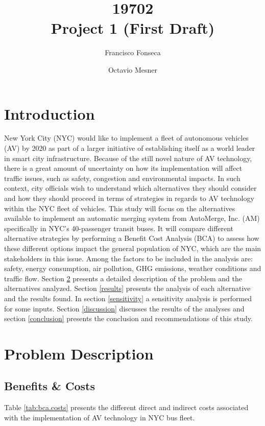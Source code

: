 \documentclass[11pt, letterpaper]{article}
\title{\vspace{-2cm} 19702 \\ Project 1 (First Draft)}
\author{Francisco Fonseca \and Octavio Mesner}
\date{\mydate}
\date{\mydateformat\normalsize\mydate} %
\begin{document}
\maketitle %

\section{Introduction} \label{intro}

New York City (NYC) would like to implement a fleet of autonomous vehicles (AV) by 2020 as part of a larger initiative of establishing itself as a world leader in smart city infrastructure. Because of the still novel nature of AV technology, there is a great amount of uncertainty on how its implementation will affect traffic issues, such as safety, congestion and environmental impacts. In such context, city officials wish to understand which alternatives they should consider and how they should proceed in terms of strategies in regards to AV technology within the NYC fleet of vehicles. This study will focus on the alternatives available to implement an automatic merging system from AutoMerge, Inc. (AM) specifically in NYC's 40-passenger transit buses. It will compare different alternative strategies by performing a Benefit Cost Analysis (BCA) to assess how these different options impact the general population of NYC, which are the main stakeholders in this issue. Among the factors to be included in the analysis are: safety, energy consumption, air pollution, GHG emissions, weather conditions and traffic flow. Section \ref{problem} presents a detailed description of the problem and the alternatives analyzed. Section \ref{results} presents the analysis of each alternative and the results found. In section \ref{sensitivity} a sensitivity analysis is performed for some inputs. Section \ref{discussion} discusses the results of the analyses and section \ref{conclusion} presents the conclusion and recommendations of this study.

\section{Problem Description} \label{problem}

\subsection{Benefits \& Costs}

Table \ref{tab:bca.costs} presents the different direct and indirect costs associated with the implementation of AV technology in NYC bus fleet.
\end{document}
